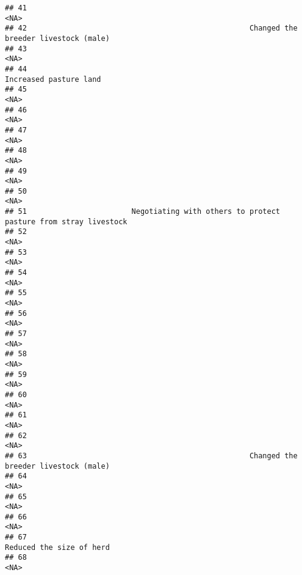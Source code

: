 \documentclass[
]{article}
\begin{document}
\begin{verbatim}
## 41                                                                                   <NA>
## 42                                                   Changed the breeder livestock (male)
## 43                                                                                   <NA>
## 44                                                                 Increased pasture land
## 45                                                                                   <NA>
## 46                                                                                   <NA>
## 47                                                                                   <NA>
## 48                                                                                   <NA>
## 49                                                                                   <NA>
## 50                                                                                   <NA>
## 51                        Negotiating with others to protect pasture from stray livestock
## 52                                                                                   <NA>
## 53                                                                                   <NA>
## 54                                                                                   <NA>
## 55                                                                                   <NA>
## 56                                                                                   <NA>
## 57                                                                                   <NA>
## 58                                                                                   <NA>
## 59                                                                                   <NA>
## 60                                                                                   <NA>
## 61                                                                                   <NA>
## 62                                                                                   <NA>
## 63                                                   Changed the breeder livestock (male)
## 64                                                                                   <NA>
## 65                                                                                   <NA>
## 66                                                                                   <NA>
## 67                                                               Reduced the size of herd
## 68                                                                                   <NA>

\end{verbatim}
\end{document}
